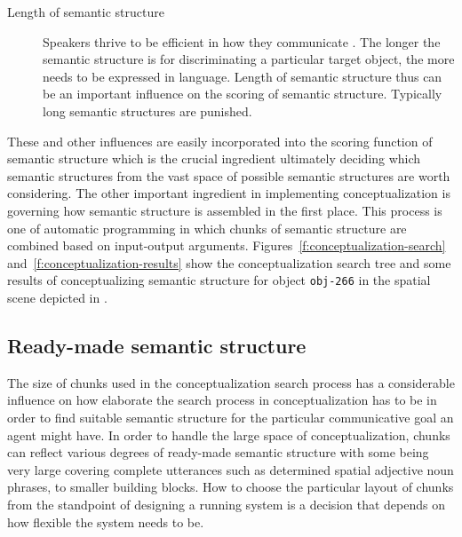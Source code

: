 \begin{description}
\item[Length of semantic structure]
Speakers thrive to be efficient in how
they communicate \citep{dale1995computational}. The longer the 
semantic structure is for
discriminating a particular target object, the more needs to
be expressed in language. Length of semantic structure thus 
can be an important influence on the scoring of semantic structure.
Typically long semantic structures are punished.
\end{description}

These and other influences are easily incorporated 
into the scoring function of semantic structure which is the crucial
ingredient ultimately deciding which semantic structures from the vast space
of possible semantic structures are worth considering. 
The other important ingredient in implementing conceptualization 
is governing how semantic structure is assembled in the first place.
This process is one of automatic programming in which
chunks of semantic structure are combined based on 
input-output arguments. Figures~\ref{f:conceptualization-search} 
and~\ref{f:conceptualization-results} show the conceptualization 
search tree and some results of conceptualizing semantic 
structure for object {\footnotesize\tt obj-266} 
in the spatial scene depicted in .


\subsection{Ready-made semantic structure}
The size of chunks used in the conceptualization search process 
has a considerable influence on how elaborate
the search process in conceptualization has to be in order to find suitable
semantic structure for the particular communicative goal an agent might have.
In order to handle the large space of conceptualization, chunks can 
reflect various degrees of ready-made semantic structure with some 
being very large covering complete utterances such as determined spatial
adjective noun phrases, to smaller building blocks. How to choose 
the particular layout of chunks from the standpoint of designing
a running system is a decision that depends on how flexible the system
needs to be.


